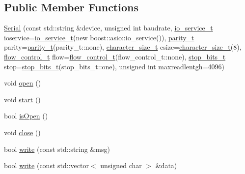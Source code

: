 \subsection*{Public Member Functions}
\begin{DoxyCompactItemize}
\item 
\hyperlink{classo_cpt_1_1protocol_1_1_serial_abb3db34ff95ecca7634e8b57095078a2}{Serial} (const std\+::string \&device, unsigned int baudrate, \hyperlink{classo_cpt_1_1protocol_1_1_serial_ac9305799ef4be4eb50f1274184492f04}{io\+\_\+service\+\_\+t} ioservice=\hyperlink{classo_cpt_1_1protocol_1_1_serial_ac9305799ef4be4eb50f1274184492f04}{io\+\_\+service\+\_\+t}(new boost\+::asio\+::io\+\_\+service()), \hyperlink{classo_cpt_1_1protocol_1_1_serial_aae21a39fe2f321475ca19d46bf40d5f3}{parity\+\_\+t} parity=\hyperlink{classo_cpt_1_1protocol_1_1_serial_aae21a39fe2f321475ca19d46bf40d5f3}{parity\+\_\+t}(parity\+\_\+t\+::none), \hyperlink{classo_cpt_1_1protocol_1_1_serial_a8799e83d5d812132c296dd4a6a17d6f6}{character\+\_\+size\+\_\+t} csize=\hyperlink{classo_cpt_1_1protocol_1_1_serial_a8799e83d5d812132c296dd4a6a17d6f6}{character\+\_\+size\+\_\+t}(8), \hyperlink{classo_cpt_1_1protocol_1_1_serial_ad32f1d64fb16a5443d7aae92e8b14232}{flow\+\_\+control\+\_\+t} flow=\hyperlink{classo_cpt_1_1protocol_1_1_serial_ad32f1d64fb16a5443d7aae92e8b14232}{flow\+\_\+control\+\_\+t}(flow\+\_\+control\+\_\+t\+::none), \hyperlink{classo_cpt_1_1protocol_1_1_serial_aadc4c803ade35920211e6c6a202a8c1f}{stop\+\_\+bits\+\_\+t} stop=\hyperlink{classo_cpt_1_1protocol_1_1_serial_aadc4c803ade35920211e6c6a202a8c1f}{stop\+\_\+bits\+\_\+t}(stop\+\_\+bits\+\_\+t\+::one), unsigned int maxreadlentgh=4096)
\item 
void \hyperlink{classo_cpt_1_1protocol_1_1_serial_a7738b1566f37b36c97055a8800482a10}{open} ()
\item 
void \hyperlink{classo_cpt_1_1protocol_1_1_serial_a6231948447729037b55df7531065749f}{start} ()
\item 
bool \hyperlink{classo_cpt_1_1protocol_1_1_serial_ab63afb811bbfd0da9cba8a4edf8d76fe}{is\+Open} ()
\item 
void \hyperlink{classo_cpt_1_1protocol_1_1_serial_a8c7e9cd0aaa7c31893cf4380e8148fec}{close} ()
\item 
bool \hyperlink{classo_cpt_1_1protocol_1_1_serial_aa8e04c844af565e2532e771002a5a654}{write} (const std\+::string \&msg)
\item 
bool \hyperlink{classo_cpt_1_1protocol_1_1_serial_ae99cac9dc20997ca09742df8d1bc6091}{write} (const std\+::vector$<$ unsigned char $>$ \&data)

\end{DoxyCompactItemize}
